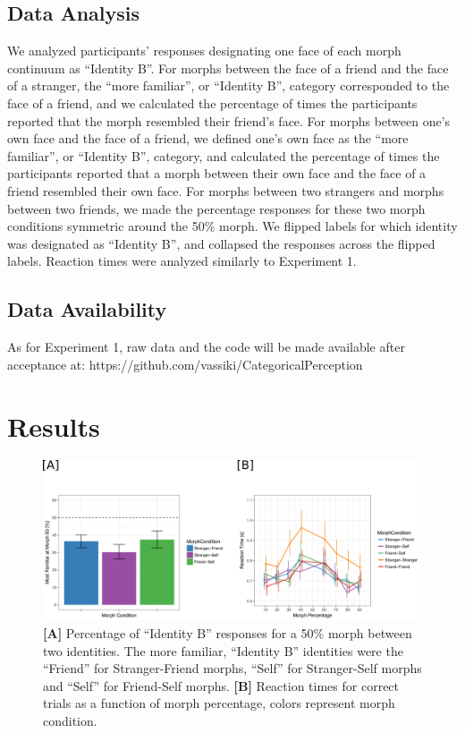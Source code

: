 \documentclass[10pt,letterpaper]{article}
\begin{document}
\subsection*{Data Analysis}
We analyzed participants’ responses designating one face of each morph continuum as “Identity B”. For morphs between the face of a friend and the face of a stranger, the “more familiar”, or “Identity B”, category corresponded to the face of a friend, and we calculated the percentage of times the participants reported that the morph resembled their friend’s face. For morphs between one’s own face and the face of a friend, we defined one’s own face as the “more familiar”, or “Identity B”, category, and calculated the percentage of times the participants reported that a morph between their own face and the face of a friend resembled their own face. For morphs between two strangers and morphs between two friends, we made the percentage responses for these two morph conditions symmetric around the 50\% morph. We flipped labels for which identity was designated as “Identity B”, and collapsed the responses across the flipped labels. Reaction times were analyzed similarly to Experiment 1.

\subsection*{Data Availability}
As for Experiment 1, raw data and the code will be made available after acceptance at: https://github.com/vassiki/CategoricalPerception

\section*{Results}

\begin{figure}[ht!] %

\includegraphics[width=\textwidth]{final_figure3.png}

\caption{\color{Gray} \textbf{[A]} Percentage of “Identity B” responses for a 50\% morph between two identities. The more familiar, “Identity B” identities were the “Friend” for Stranger-Friend morphs, “Self” for Stranger-Self morphs and “Self” for Friend-Self morphs. \textbf{[B]} Reaction times for correct trials as a function of morph percentage, colors represent morph condition.}

\label{Figure 3} %

\end{figure}
\end{document}
